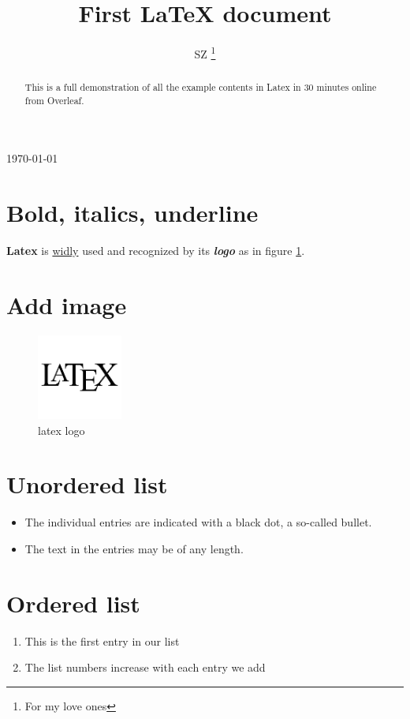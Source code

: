 \documentclass[12pt, letterpaper, twoside]{article}
\begin{document}
\title{First \LaTeX{} document}
\author{SZ \thanks{For my love ones}}
\today
\maketitle

\tableofcontents

\begin{abstract}
This is a full demonstration of all the example contents in Latex in 30 minutes online from Overleaf.
\end{abstract}

\section{Bold, italics, underline}

\textbf{Latex} is \underline{widly} used and recognized by its \textbf{\textit{logo}} as in figure \ref{fig:logo}. 

\section{Add image}

\begin{figure}[h]
    \centering
    \includegraphics[width=0.25\textwidth]{latex}
    \caption{latex logo}
    \label{fig:logo}
\end{figure}

\section{Unordered list}
\begin{itemize}
  \item The individual entries are indicated with a black dot, a so-called bullet.
  \item The text in the entries may be of any length.
\end{itemize}

\section{Ordered list}
\begin{enumerate}
  \item This is the first entry in our list
  \item The list numbers increase with each entry we add
\end{enumerate}
\end{document}

